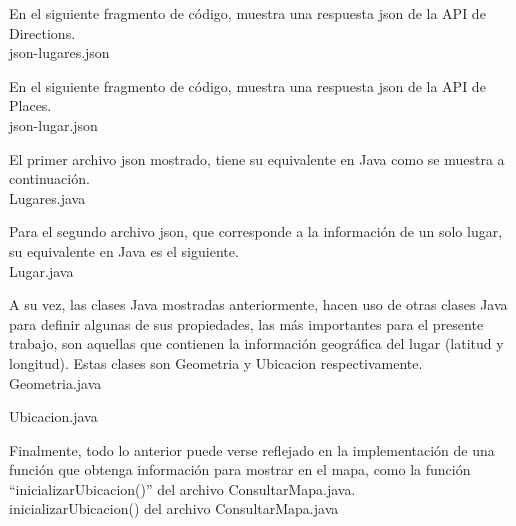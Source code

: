 En el siguiente fragmento de código, muestra una respuesta json de la API de Directions.\\

json-lugares.json


En el siguiente fragmento de código, muestra una respuesta json de la API de Places.\\

json-lugar.json



El primer archivo json mostrado, tiene su equivalente en Java como se muestra a continuación.\\

Lugares.java



Para el segundo archivo json, que corresponde a la información de un solo lugar, su equivalente en Java es el siguiente.\\

Lugar.java



A su vez, las clases Java mostradas anteriormente, hacen uso de otras clases Java para definir algunas de sus propiedades, las más importantes para el presente trabajo, son aquellas que contienen la información geográfica del lugar (latitud y longitud). Estas clases son Geometria y Ubicacion respectivamente.\\

Geometria.java



Ubicacion.java


Finalmente, todo lo anterior puede verse reflejado en la implementación de una función que obtenga información para mostrar en el mapa, como la función ``inicializarUbicacion()'' del archivo ConsultarMapa.java.\\

inicializarUbicacion() del archivo ConsultarMapa.java 



